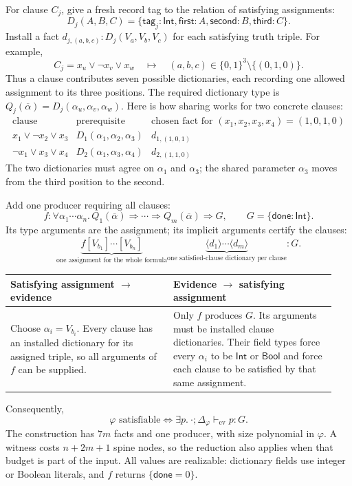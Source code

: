 \documentclass[10pt,a4paper]{article}
\newcommand{\Int}{\mathsf{Int}}
\newcommand{\Bool}{\mathsf{Bool}}
\newcommand{\iarg}[1]{\langle#1\rangle}
\newcommand{\kw}[1]{\mathsf{#1}}
\begin{document}
For clause $C_j$, give a fresh record tag to the relation of satisfying assignments:
\[
 D_j(A,B,C)=\{\kw{tag}_j:\Int,\kw{first}:A,\kw{second}:B,\kw{third}:C\}.
\]
Install a fact $d_{j,(a,b,c)}:D_j(V_a,V_b,V_c)$ for each satisfying truth triple.
For example,
\[
 C_j=x_u\lor\neg x_v\lor x_w
 \quad\longmapsto\quad
 (a,b,c)\in\{0,1\}^3\setminus\{(0,1,0)\}.
\]
Thus a clause contributes seven possible dictionaries, each recording one allowed
assignment to its three positions. The required dictionary type is
$Q_j(\overline\alpha)=D_j(\alpha_u,\alpha_v,\alpha_w)$.
Here is how sharing works for two concrete clauses:
\[
\begin{array}{c|c|c}
 \text{clause} & \text{prerequisite} & \text{chosen fact for }(x_1,x_2,x_3,x_4)=(1,0,1,0)\\ \hline
 x_1\lor\neg x_2\lor x_3
   & D_1(\alpha_1,\alpha_2,\alpha_3) & d_{1,(1,0,1)}\\
 \neg x_1\lor x_3\lor x_4
   & D_2(\alpha_1,\alpha_3,\alpha_4) & d_{2,(1,1,0)}
\end{array}
\]
The two dictionaries must agree on $\alpha_1$ and $\alpha_3$; the shared parameter
$\alpha_3$ moves from the third position to the second.

Add one producer requiring all clauses:
\[
 f:\forall\alpha_1\cdots\alpha_n.\,
 Q_1(\overline\alpha)\Rightarrow\cdots\Rightarrow Q_m(\overline\alpha)\Rightarrow G,
 \qquad G=\{\kw{done}:\Int\}.
\]
Its type arguments are the assignment; its implicit arguments certify the clauses:
\[
 \underbrace{f[V_{b_1}]\cdots[V_{b_n}]}_{\text{one assignment for the whole formula}}
 \underbrace{\iarg{d_1}\cdots\iarg{d_m}}_{\text{one satisfied-clause dictionary per clause}}
 :G.
\]

\begin{center}
\begin{tabular}{@{}p{0.47\linewidth}p{0.47\linewidth}@{}}
\toprule
Satisfying assignment $\longrightarrow$ evidence & Evidence $\longrightarrow$ satisfying assignment\\
\midrule
Choose $\alpha_i=V_{b_i}$. Every clause has an installed dictionary for its
assigned triple, so all arguments of $f$ can be supplied.
&
Only $f$ produces $G$. Its arguments must be installed clause dictionaries.
Their field types force every $\alpha_i$ to be $\Int$ or $\Bool$ and force
each clause to be satisfied by that same assignment.\\
\bottomrule
\end{tabular}
\end{center}
Consequently,
\[
 \boxed{\varphi\text{ satisfiable}\iff
        \exists p.\ \cdot;\Delta_\varphi\vdash_{\mathrm{ev}}p:G.}
\]
The construction has $7m$ facts and one producer, with size polynomial in $\varphi$.
A witness costs $n+2m+1$ spine nodes, so the reduction also applies when that budget
is part of the input. All values are realizable: dictionary fields use integer or
Boolean literals, and $f$ returns $\{\kw{done}=0\}$.
\end{document}
